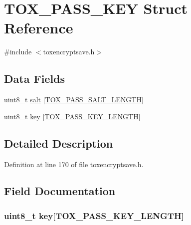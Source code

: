 \hypertarget{struct_t_o_x___p_a_s_s___k_e_y}{\section{T\+O\+X\+\_\+\+P\+A\+S\+S\+\_\+\+K\+E\+Y Struct Reference}
\label{struct_t_o_x___p_a_s_s___k_e_y}
}


{\ttfamily \#include $<$toxencryptsave.\+h$>$}

\subsection*{Data Fields}
\begin{DoxyCompactItemize}
\item 
uint8\+\_\+t \hyperlink{struct_t_o_x___p_a_s_s___k_e_y_a6434f2e799e75beacc91c217bc797339}{salt} \mbox{[}\hyperlink{toxencryptsave_8h_a0ff111eed3881653e1a92c4336f9a9be}{T\+O\+X\+\_\+\+P\+A\+S\+S\+\_\+\+S\+A\+L\+T\+\_\+\+L\+E\+N\+G\+T\+H}\mbox{]}
\item 
uint8\+\_\+t \hyperlink{struct_t_o_x___p_a_s_s___k_e_y_aaa46672326ab451b679129167f39055e}{key} \mbox{[}\hyperlink{toxencryptsave_8h_a8e5511f90092895c32a350c1044650fc}{T\+O\+X\+\_\+\+P\+A\+S\+S\+\_\+\+K\+E\+Y\+\_\+\+L\+E\+N\+G\+T\+H}\mbox{]}
\end{DoxyCompactItemize}


\subsection{Detailed Description}


Definition at line 170 of file toxencryptsave.\+h.



\subsection{Field Documentation}
\hypertarget{struct_t_o_x___p_a_s_s___k_e_y_aaa46672326ab451b679129167f39055e}{
\subsubsection[{key}]{\setlength{\rightskip}{0pt plus 5cm}uint8\+\_\+t key\mbox{[}{\bf T\+O\+X\+\_\+\+P\+A\+S\+S\+\_\+\+K\+E\+Y\+\_\+\+L\+E\+N\+G\+T\+H}\mbox{]}}}\label{struct_t_o_x___p_a_s_s___k_e_y_aaa46672326ab451b679129167f39055e}


